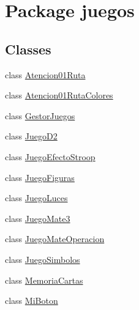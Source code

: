 \hypertarget{namespacejuegos}{}\section{Package juegos}
\label{namespacejuegos}
\subsection*{Classes}
\begin{DoxyCompactItemize}
\item 
class \mbox{\hyperlink{classjuegos_1_1_atencion01_ruta}{Atencion01\+Ruta}}
\item 
class \mbox{\hyperlink{classjuegos_1_1_atencion01_ruta_colores}{Atencion01\+Ruta\+Colores}}
\item 
class \mbox{\hyperlink{classjuegos_1_1_gestor_juegos}{Gestor\+Juegos}}
\item 
class \mbox{\hyperlink{classjuegos_1_1_juego_d2}{Juego\+D2}}
\item 
class \mbox{\hyperlink{classjuegos_1_1_juego_efecto_stroop}{Juego\+Efecto\+Stroop}}
\item 
class \mbox{\hyperlink{classjuegos_1_1_juego_figuras}{Juego\+Figuras}}
\item 
class \mbox{\hyperlink{classjuegos_1_1_juego_luces}{Juego\+Luces}}
\item 
class \mbox{\hyperlink{classjuegos_1_1_juego_mate3}{Juego\+Mate3}}
\item 
class \mbox{\hyperlink{classjuegos_1_1_juego_mate_operacion}{Juego\+Mate\+Operacion}}
\item 
class \mbox{\hyperlink{classjuegos_1_1_juego_simbolos}{Juego\+Simbolos}}
\item 
class \mbox{\hyperlink{classjuegos_1_1_memoria_cartas}{Memoria\+Cartas}}
\item 
class \mbox{\hyperlink{classjuegos_1_1_mi_boton}{Mi\+Boton}}
\end{DoxyCompactItemize}
